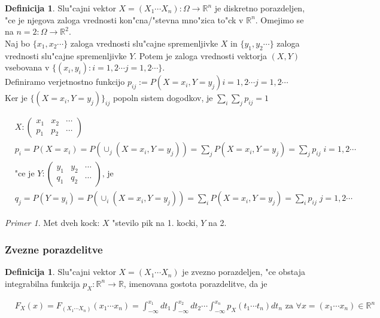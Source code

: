 \documentclass[a4paper,12pt]{article}
\theoremstyle{definition}
\newtheorem{defn}[counter]{Definicija}
\theoremstyle{remark}
\newtheorem*{ex}{Primer}
\newcommand{\R}{\mathbb{R}}
\begin{document}
\begin{defn}
    Slu"cajni vektor $X = (X_1 \cdots X_n): \Omega \to \R^n$ je diskretno porazdeljen, "ce je njegova zaloga vrednosti
    kon"cna/"stevna mno"zica to"ck v $\R^n$. Omejimo se na $n=2: \Omega \to \R^2$. \\
    Naj bo $\{x_1, x_2 \cdots\}$ zaloga vrednosti slu"cajne spremenljivke $X$ in $\{y_1, y_2 \cdots\}$ zaloga
    vrednosti slu"cajne spremenljivke $Y$. Potem je zaloga vrednosti vektorja $(X,Y)$ vsebovana v
    $\{(x_i, y_i): i = 1,2 \cdots j = 1,2 \cdots \}$. \\
    Definiramo verjetnostno funkcijo $p_{ij} := P(X = x_i, Y = y_j) i = 1,2 \cdots j = 1,2 \cdots$ \\
    Ker je $\{(X = x_i, Y = y_j)\}_{ij}$ popoln sistem dogodkov, je $\sum_i \sum_j p_{ij} = 1$
\end{defn}

\begin{align*}
    &X: \begin{pmatrix}
            x_1 & x_2 & \cdots \\
            p_1 & p_2 & \cdots
        \end{pmatrix} \\
    &p_i = P(X = x_i) = P(\cup_j (X = x_i, Y = y_j)) = \sum_j P(X = x_i, Y = y_j) = \sum_j p_{ij} \; i = 1,2 \cdots \\
    &\text{"ce je } Y: \begin{pmatrix}
            y_1 & y_2 & \cdots \\
            q_1 & q_2 & \cdots
        \end{pmatrix} \text{, je } \\
    &q_j = P(Y = y_i) = P(\cup_i (X = x_i, Y = y_j)) = \sum_i P(X = x_i, Y = y_j) = \sum_i p_{ij} \; j = 1,2 \cdots
\end{align*}

\begin{ex}
    Met dveh kock: $X$ "stevilo pik na 1. kocki, $Y$ na 2.
\end{ex}

\subsubsection{Zvezne porazdelitve}

\begin{defn}
    Slu"cajni vektor $X = (X_1 \cdots X_n)$ je zvezno porazdeljen, "ce obstaja integrabilna funkcija $p_X: \R^n \to \R$,
    imenovana gostota porazdelitve, da je

    \begin{align*}
        &F_X(x) = F_{(X_1 \cdots X_n)}(x_1 \cdots x_n) = \int_{-\infty}^{x_1} dt_1 \int_{-\infty}^{x_2} dt_2 \cdots
            \int_{-\infty}^{x_n} p_X(t_1 \cdots t_n) dt_n \text{ za } \forall x = (x_1 \cdots x_n) \in \R^n
    \end{align*}
\end{defn}
\end{document}
